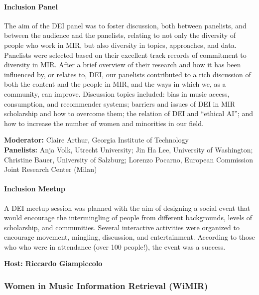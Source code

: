 \paragraph*{Inclusion Panel}

The aim of the DEI panel was to foster discussion, both between panelists, and between the audience and the panelists, relating to not only the diversity of people who work in MIR, but also diversity in topics, approaches, and data. 
Panelists were selected based on their excellent track records of commitment to diversity in MIR. After a brief overview of their research and how it has been influenced by, or relates to, DEI, our panelists contributed to a rich discussion of both the content and the people in MIR, and the ways in which we, as a community, can improve.
Discussion topics included: bias in music access, consumption, and recommender systems; barriers and issues of DEI in MIR scholarship and how to overcome them; the relation of DEI and ``ethical AI''; and how to increase the number of women and minorities in our field.


\textbf{Moderator:} Claire Arthur, Georgia Institute of Technology \\ 
\textbf{Panelists:} Anja Volk, Utrecht University; Jin Ha Lee, University of Washington; Christine Bauer, University of Salzburg; Lorenzo Pocarno, European Commission Joint Research Center (Milan)

\paragraph*{Inclusion Meetup}

A DEI meetup session was planned with the aim of designing a social event that would encourage the intermingling of people from different backgrounds, levels of scholarship, and communities. 
Several interactive activities were organized to encourage movement, mingling, discussion, and entertainment.
According to those who who were in attendance (over 100 people!), the event was a success.

\textbf{Host: Riccardo Giampiccolo} 


\subsubsection*{Women in Music Information Retrieval (WiMIR)}

